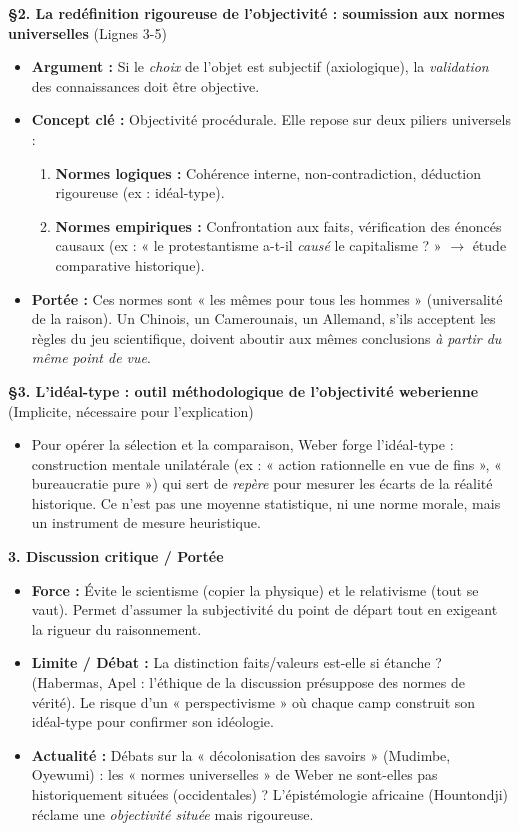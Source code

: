 \documentclass[11pt]{article}
\newcommand{\cle}[1]{{\popxbold\color{popdark}#1}}
\begin{document}
\begin{exoresolu}
    \textbf{§2. La redéfinition rigoureuse de l'objectivité : soumission aux normes universelles} (Lignes 3-5)
    \begin{itemize}
        \item \textbf{Argument :} Si le \emph{choix} de l'objet est subjectif (axiologique), la \emph{validation} des connaissances doit être objective.
        \item \textbf{Concept clé :} \cle{Objectivité procédurale}. Elle repose sur deux piliers universels :
        \begin{enumerate}
            \item \textbf{Normes logiques :} Cohérence interne, non-contradiction, déduction rigoureuse (ex : idéal-type).
            \item \textbf{Normes empiriques :} Confrontation aux faits, vérification des énoncés causaux (ex : « le protestantisme a-t-il \emph{causé} le capitalisme ? » $\rightarrow$ étude comparative historique).
        \end{enumerate}
        \item \textbf{Portée :} Ces normes sont « les mêmes pour tous les hommes » (universalité de la raison). Un Chinois, un Camerounais, un Allemand, s'ils acceptent les règles du jeu scientifique, doivent aboutir aux mêmes conclusions \emph{à partir du même point de vue}.
    \end{itemize}

    \textbf{§3. L'idéal-type : outil méthodologique de l'objectivité weberienne} (Implicite, nécessaire pour l'explication)
    \begin{itemize}
        \item Pour opérer la sélection et la comparaison, Weber forge l'\cle{idéal-type} : construction mentale unilatérale (ex : « action rationnelle en vue de fins », « bureaucratie pure ») qui sert de \emph{repère} pour mesurer les écarts de la réalité historique. Ce n'est pas une moyenne statistique, ni une norme morale, mais un instrument de mesure heuristique.
    \end{itemize}

    \textbf{3. Discussion critique / Portée}
    \begin{itemize}
        \item \textbf{Force :} Évite le scientisme (copier la physique) et le relativisme (tout se vaut). Permet d'assumer la subjectivité du point de départ tout en exigeant la rigueur du raisonnement.
        \item \textbf{Limite / Débat :} La distinction faits/valeurs est-elle si étanche ? (Habermas, Apel : l'éthique de la discussion présuppose des normes de vérité). Le risque d'un « perspectivisme » où chaque camp construit son idéal-type pour confirmer son idéologie.
        \item \textbf{Actualité :} Débats sur la « décolonisation des savoirs » (Mudimbe, Oyewumi) : les « normes universelles » de Weber ne sont-elles pas historiquement situées (occidentales) ? L'épistémologie africaine (Hountondji) réclame une \emph{objectivité située} mais rigoureuse.
    \end{itemize}


\end{exoresolu}
\end{document}
